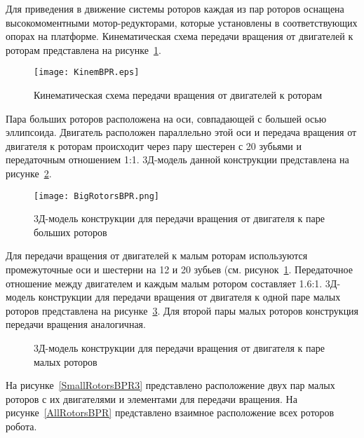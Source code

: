 Для приведения в движение системы роторов каждая из пар роторов оснащена высокомоментными мотор-редукторами, которые установлены в соответствующих опорах на платформе. Кинематическая схема передачи вращения от двигателей к роторам представлена на рисунке~\ref{KinemBPR}.

\begin{figure}[h]
	\centering
	\texttt{[image: KinemBPR.eps]}%
	\caption{Кинематическая схема передачи вращения от двигателей к роторам}
	\label{KinemBPR}
\end{figure}

Пара больших роторов расположена на оси, совпадающей с большей осью эллипсоида. Двигатель расположен параллельно этой оси и передача вращения от двигателя к роторам происходит через пару шестерен с 20 зубьями и передаточным отношением 1:1. 3Д-модель данной конструкции представлена на рисунке~\ref{BigRotorsBPR}.

\begin{figure}[h]
	\centering
	\texttt{[image: BigRotorsBPR.png]}%
	\caption{3Д-модель конструкции для передачи вращения от двигателя к паре больших роторов}
	\label{BigRotorsBPR}
\end{figure}

Для передачи вращения от двигателей к малым роторам используются промежуточные оси и шестерни на 12 и 20 зубьев (см. рисунок~\ref{KinemBPR}. Передаточное отношение между двигателем и каждым малым ротором составляет 1.6:1. 3Д-модель конструкции для передачи вращения от двигателя к одной паре малых роторов представлена на рисунке~\ref{SmallRotorsBPR}. Для второй пары малых роторов конструкция передачи вращения аналогичная.

\begin{figure}[!ht]
	\begin{minipage}[h]{0.5\linewidth}
	\end{minipage}
	\hfill
	\begin{minipage}[h]{0.5\linewidth}
	\end{minipage}
	\caption{3Д-модель конструкции для передачи вращения от двигателя к паре малых роторов}
	\label{SmallRotorsBPR}
\end{figure}

На рисунке~\ref{SmallRotorsBPR3} представлено расположение двух пар малых роторов с их двигателями и элементами для передачи вращения. На рисунке~\ref{AllRotorsBPR} представлено взаимное расположение всех роторов робота.

